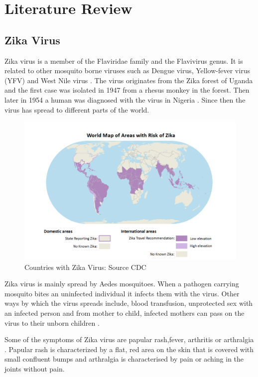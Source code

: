 \chapter{Literature Review}
\section{Zika Virus}
Zika virus is a member of the Flaviridae family
and the Flavivirus genus.
It is related to other mosquito borne viruses such as Dengue virus, Yellow-fever  virus (YFV)  and West Nile virus \citep{doi}.
The virus originates from the Zika forest of Uganda and the first case was isolated in 1947 from a rhesus monkey in the forest. Then later in 1954 a human was diagnosed with the virus in Nigeria \citep{2015zika}. Since then the virus has spread to different parts of the world. 
\begin{figure}[h!]
\centering
\includegraphics[scale=0.5]{images/map_zika.png} 
\caption{Countries with Zika Virus: Source CDC}\label{fig 1}
\end{figure}


Zika virus is mainly spread by Aedes mosquitoes. When a pathogen carrying mosquito bites an uninfected individual it infects them with the virus.
Other ways  by which the virus spreads include,
blood transfusion, unprotected sex with an infected person and from mother to child, infected mothers can pass on the virus to their unborn children \citep{musso2014}.

Some of the symptoms of Zika virus  are papular rash,fever, arthritis or arthralgia \cite{musso2015}. Papular rash is  characterized by a flat, red area on the skin that is covered with small confluent bumps and arthralgia is characterised by pain or aching in the joints without pain.

